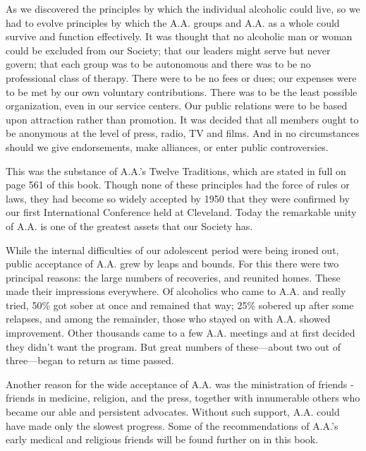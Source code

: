 \begin{biblechapter}
\verse As we discovered the principles by which 
    the individual alcoholic could live, 
    so we had to evolve principles by which the A.A. groups 
    and A.A. as a whole 
    could survive and function effectively. 
\verse It was thought that no alcoholic man or woman 
    could be excluded from our Society; 
    that our leaders might serve but never govern; 
    that each group was to be autonomous 
    and there was to be no professional class of therapy.
\verse There were to be no fees or dues; 
    our expenses were to be met by our own voluntary contributions.
\verse There was to be the least possible organization, 
    even in our service centers. 
\verse Our public relations were to be based upon attraction 
    rather than promotion. 
\verse It was decided that all members ought to be anonymous 
    at the level of press, radio, TV and films. 
\verse And in no circumstances should we give endorsements, 
    make alliances, 
    or enter public controversies.

\verse This was the substance of A.A.’s Twelve Traditions, 
    which are stated in full on page 561 of this book.
\verse Though none of these principles had the force of rules or laws, 
    they had become so widely accepted by 1950 
    that they were confirmed by our first 
    International Conference held at Cleveland. 
\verse Today the remarkable unity of A.A. 
    is one of the greatest assets that our Society has.

    While the internal difficulties 
    of our adolescent period were being ironed out, 
    public acceptance of A.A. grew by leaps and bounds.
\verse For this there were two principal reasons: 
    the large numbers of recoveries, 
    and reunited homes.
\verse These made their impressions everywhere.
\verse Of alcoholics who came to A.A. and really tried, 
    50\% got sober at once and remained that way;
    25\% sobered up after some relapses, 
    and among the remainder, 
    those who stayed on with A.A. showed improvement.
\verse Other thousands came to a few A.A. meetings 
    and at first decided they didn’t want the program.
\verse But great numbers of these—about two out of three—began 
    to return as time passed.

\verse Another reason for the wide acceptance of A.A. 
    was the ministration of friends - 
    friends in medicine, religion, and the press, 
    together with innumerable others 
    who became our able and persistent advocates.
\verse Without such support, 
    A.A. could have made only the slowest progress.
\verse Some of the recommendations of A.A.’s early medical 
    and religious friends 
    will be found further on in this book.


\end{biblechapter}
